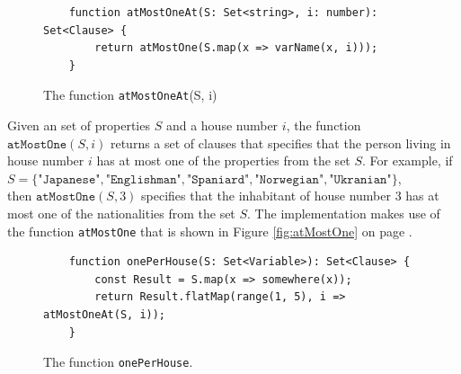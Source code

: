 \begin{figure}[!ht]
\centering
\begin{verbatim}
    function atMostOneAt(S: Set<string>, i: number): Set<Clause> {
        return atMostOne(S.map(x => varName(x, i)));
    }
\end{verbatim}
\vspace*{-0.3cm}
\caption{The function \texttt{atMostOneAt}(S, i)}
\label{fig:atMostOneAt}
\end{figure}

Given an set of properties $S$ and a house number $i$, the function
$\texttt{atMostOne}(S, i)$ returns a set of clauses that specifies that the
person living in house number $i$ has at most one of the properties from the set
$S$.  For example, if  
\\[0.2cm]
\hspace*{1.3cm}
$S = \{\texttt{"Japanese"}, \texttt{"Englishman"}, \texttt{"Spaniard"}, \texttt{"Norwegian"}, \texttt{"Ukranian"}\}$, 
\\[0.2cm]
then $\texttt{atMostOne}(S, 3)$ specifies that the inhabitant of house number 3
has at most one of the nationalities from the set $S$.   The implementation
makes use of the function \texttt{atMostOne} that is shown in Figure
\ref{fig:atMostOne} on page \pageref{fig:atMostOne}.

\begin{figure}[!ht]
\centering
\begin{verbatim}
    function onePerHouse(S: Set<Variable>): Set<Clause> {
        const Result = S.map(x => somewhere(x));
        return Result.flatMap(range(1, 5), i => atMostOneAt(S, i));
    }
\end{verbatim}
\vspace*{-0.3cm}
\caption{The function \texttt{onePerHouse}.}
\label{fig:onePerHouse}
\end{figure}


